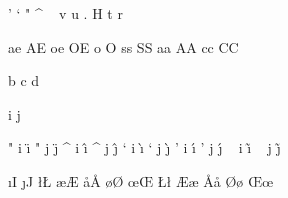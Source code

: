 
\let\dotlessi=\i
\let\dotlessj=\j


\redefineaccent    '   %
\redefineaccent    `   %
\redefineaccent    "   %
\redefineaccent    ^   %
\redefineaccent    ~   %
\redefineaccent    v   %
\redefineaccent    u   %
\redefineaccent    .   %
\redefineaccent    H   %
\redefineaccent    t   %
\redefineaccent    r   %

\redefinecharacter ae  %
\redefinecharacter AE  %
\redefinecharacter oe  %
\redefinecharacter OE  %
\redefinecharacter o   %
\redefinecharacter O   %
\redefinecharacter ss  %
\redefinecharacter SS  %
\redefinecharacter aa  %
\redefinecharacter AA  %
\redefinecharacter cc  %
\redefinecharacter CC  %

\redefinecommand b
\redefinecommand c
\redefinecommand d

\redefinecommand i %
\redefinecommand j %

 " i {\"\i}   " j {\"\j}
 ^ i {\^\i}   ^ j {\^\j}
 ` i {\`\i}   ` j {\`\j}
 ' i {\'\i}   ' j {\'\j}
 ~ i {\~\i}   ~ j {\~\j}


\startmapping[\nocharacterencoding] 

 \i  {I}
 \j  {J}
 {}
 \l  \L 
{} \ae \AE
{} \aa \AA
{} \o  \O 
{} \oe \OE
{} \L  \l 
{} \AE \ae
{} \AA \aa
{} \O  \o 
{} \OE \oe

\stopmapping



\protect 

\endinput 

